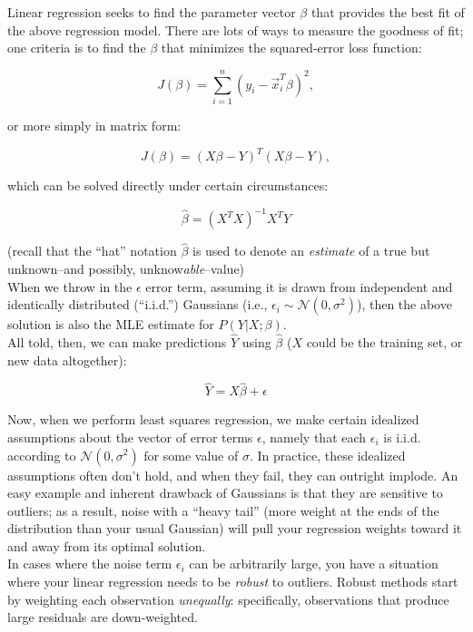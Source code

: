 \documentclass[paper=a4, fontsize=11pt]{scrartcl} %
\numberwithin{figure}{section} %
\numberwithin{table}{section} %
\begin{document}
Linear regression seeks to find the parameter vector $\beta$ that provides the best fit of the above regression model. There are lots of ways to measure the goodness of fit; one criteria is to find the $\beta$ that minimizes the squared-error loss function:

$$
J(\beta) = \sum_{i = 1}^n (y_i - \vec{x}_i^T \beta)^2,
$$

or more simply in matrix form:

\begin{equation}
J(\beta) = (X\beta - Y)^T (X\beta - Y),
\label{eq:sqerr}
\end{equation}

which can be solved directly under certain circumstances:

\begin{equation}
\hat{\beta} = (X^TX)^{-1} X^TY
\label{eq:dirsol}
\end{equation}

(recall that the ``hat'' notation $\hat{\beta}$ is used to denote an \emph{estimate} of a true but unknown--and possibly, unknow\emph{able}--value) \\

When we throw in the $\epsilon$ error term, assuming it is drawn from independent and identically distributed (``i.i.d.'') Gaussians (i.e., $\epsilon_i \sim \mathcal{N}(0, \sigma^2)$), then the above solution is also the MLE estimate for $P(Y | X; \beta)$. \\

All told, then, we can make predictions $\hat{Y}$ using $\hat{\beta}$ ($X$ could be the training set, or new data altogether):

$$
\hat{Y} = X\hat{\beta} + \epsilon
$$

Now, when we perform least squares regression, we make certain idealized assumptions about the vector of error terms $\epsilon$, namely that each $\epsilon_i$ is i.i.d. according to $\mathcal{N}(0, \sigma^2)$ for some value of $\sigma$. In practice, these idealized assumptions often don't hold, and when they fail, they can outright implode. An easy example and inherent drawback of Gaussians is that they are sensitive to outliers; as a result, noise with a ``heavy tail'' (more weight at the ends of the distribution than your usual Gaussian) will pull your regression weights toward it and away from its optimal solution. \\

In cases where the noise term $\epsilon_i$ can be arbitrarily large, you have a situation where your linear regression needs to be \emph{robust} to outliers. Robust methods start by weighting each observation \emph{unequally}: specifically, observations that produce large residuals are down-weighted. \\
\end{document}
